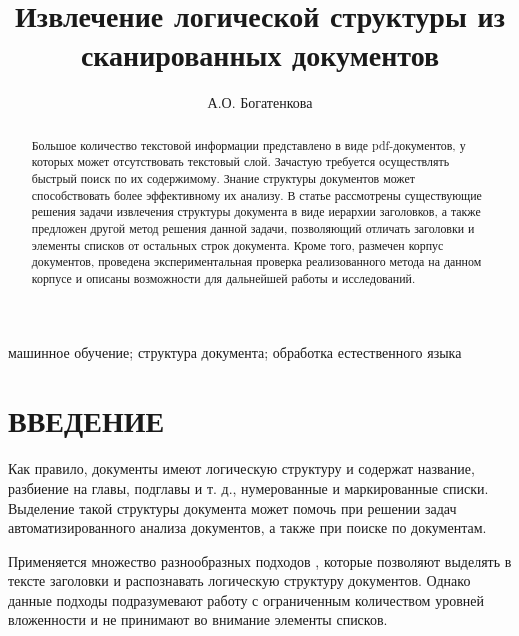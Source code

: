 \documentclass[10pt, a4paper]{ieeeconf}
\title{\LARGE \bf
Извлечение логической структуры из сканированных документов
}
\author{А.О. Богатенкова}
\affil{Институт системного программирования им. В.П. Иванникова \\
Российской академии наук, \\
Москва, Россия \\
bogatenkova.anastasiya@mail.ru}
\begin{document}
\maketitle
\thispagestyle{empty}
\pagestyle{empty}


\begin{abstract}

Большое количество текстовой информации представлено в виде pdf-документов, у которых может отсутствовать текстовый слой. Зачастую требуется осуществлять быстрый поиск по их содержимому. Знание структуры документов может способствовать более эффективному их анализу.
В статье рассмотрены существующие решения задачи извлечения структуры документа в виде иерархии заголовков, а также предложен другой метод решения данной задачи, позволяющий отличать заголовки и элементы списков от остальных строк документа. Кроме того, размечен корпус документов, проведена экспериментальная проверка реализованного метода на данном корпусе и описаны возможности для дальнейшей работы и исследований.

\end{abstract}

\begin{keywords}

машинное обучение; структура документа; обработка естественного языка

\end{keywords}


\section{ВВЕДЕНИЕ}

Как правило, документы имеют логическую структуру и содержат название, разбиение на главы, подглавы и т. д., нумерованные и маркированные списки. Выделение такой структуры документа может помочь при решении задач автоматизированного анализа документов, а также при поиске по документам.

Применяется множество разнообразных подходов \cite{link5,link6,link7}, которые позволяют выделять в тексте заголовки и распознавать логическую структуру документов. Однако данные подходы подразумевают работу с ограниченным количеством уровней вложенности и не принимают во внимание элементы списков. 
\end{document}
